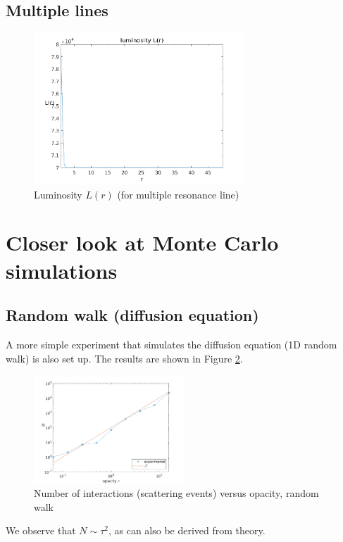 \documentclass[../main/main.tex]{subfiles}
\begin{document}
\subsection{Multiple lines}
\begin{figure}[!htp]
\centering
\includegraphics[width=0.7\textwidth]{../../two_resonance_lines/figures/luminosity_multiple_resonance_line.png}
\caption{Luminosity $L(r)$ (for multiple resonance line)}
\label{luminosity_multiple_resonance_line}
\end{figure}


\newpage
\section{Closer look at Monte Carlo simulations}
\label{diffusion_Monte_Carlo_mean_free_path}

\subsection{Random walk (diffusion equation)} A more simple experiment that simulates the diffusion equation (1D random walk) is also set up. The results are shown in Figure \ref{random_walk_N_vs_tau}.
	\begin{figure}[!htp]
	\centering
	\includegraphics[width=0.5\textwidth]{../../introductory_exercises/limb_darkening/data/diff_N_vs_opacity.png}
	\caption{Number of interactions (scattering events) versus 	opacity, random walk}
	\label{random_walk_N_vs_tau}
	\end{figure}
We observe that $N \sim \tau^2$, as can also be derived from theory.
\end{document}
